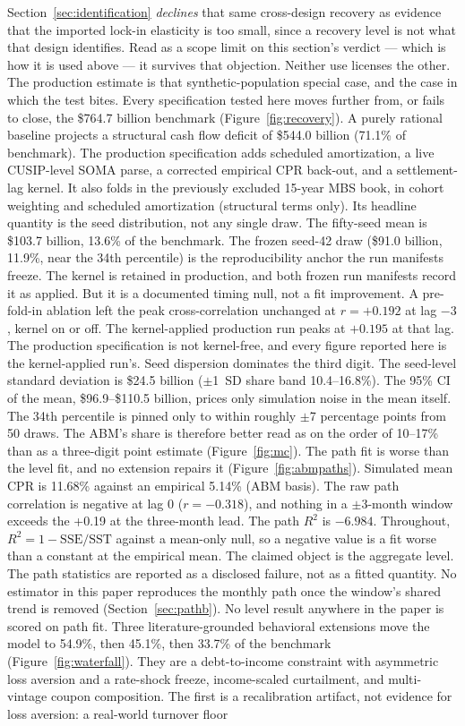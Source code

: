\documentclass[12pt]{article}
\begin{document}
Section~\ref{sec:identification} \emph{declines} that same cross-design recovery as evidence that the imported lock-in elasticity is too small, since a recovery level is not what that design identifies. Read as a scope limit on this section's verdict --- which is how it is used above --- it survives that objection. Neither use licenses the other. The production estimate is that synthetic-population special case, and the case in which the test bites. Every specification tested here moves further from, or fails to close, the \$764.7 billion benchmark (Figure~\ref{fig:recovery}). A purely rational baseline projects a structural cash flow deficit of \$544.0 billion (71.1\% of benchmark). The production specification adds scheduled amortization, a live CUSIP-level SOMA parse, a corrected empirical CPR back-out, and a settlement-lag kernel. It also folds in the previously excluded 15-year MBS book, in cohort weighting and scheduled amortization (structural terms only). Its headline quantity is the seed distribution, not any single draw. The fifty-seed mean is \$103.7 billion, 13.6\% of the benchmark. The frozen seed-42 draw (\$91.0 billion, 11.9\%, near the 34th percentile) is the reproducibility anchor the run manifests freeze. The kernel is retained in production, and both frozen run manifests record it as applied. But it is a documented timing null, not a fit improvement. A pre-fold-in ablation left the peak cross-correlation unchanged at $r = +0.192$ at lag $-3$, kernel on or off. The kernel-applied production run peaks at $+0.195$ at that lag. The production specification is not kernel-free, and every figure reported here is the kernel-applied run's. Seed dispersion dominates the third digit. The seed-level standard deviation is \$24.5 billion ($\pm$1~SD share band 10.4--16.8\%). The 95\% CI of the mean, \$96.9--\$110.5 billion, prices only simulation noise in the mean itself. The 34th percentile is pinned only to within roughly $\pm$7 percentage points from 50 draws. The ABM's share is therefore better read as on the order of 10--17\% than as a three-digit point estimate (Figure~\ref{fig:mc}). The path fit is worse than the level fit, and no extension repairs it (Figure~\ref{fig:abmpaths}). Simulated mean CPR is 11.68\% against an empirical 5.14\% (ABM basis). The raw path correlation is negative at lag 0 ($r = -0.318$), and nothing in a $\pm$3-month window exceeds the +0.19 at the three-month lead. The path $R^2$ is $-6.984$. Throughout, $R^2 = 1-\mathrm{SSE}/\mathrm{SST}$ against a mean-only null, so a negative value is a fit worse than a constant at the empirical mean. The claimed object is the aggregate level. The path statistics are reported as a disclosed failure, not as a fitted quantity. No estimator in this paper reproduces the monthly path once the window's shared trend is removed (Section~\ref{sec:pathb}). No level result anywhere in the paper is scored on path fit. Three literature-grounded behavioral extensions move the model to 54.9\%, then 45.1\%, then 33.7\% of the benchmark (Figure~\ref{fig:waterfall}). They are a debt-to-income constraint with asymmetric loss aversion and a rate-shock freeze, income-scaled curtailment, and multi-vintage coupon composition. The first is a recalibration artifact, not evidence for loss aversion: a real-world turnover floor 
\end{document}
